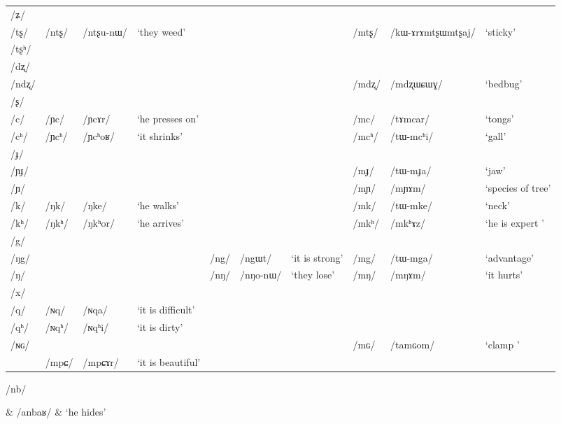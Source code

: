 \documentclass[12pt]{article}
\newcommand{\ipa}[1]{\mbox{\phon/#1/}}
\newcommand{\deux}[1]{\ipa{#1}\addtocounter{2clusters}{1}}
\newcommand{\trois}[1]{\ipa{#1}\addtocounter{3clusters}{1}}
\newcommand{\resetcounters}[2]{
\newcounter{#1}
\newcounter{#2}
 \setcounter{#1}{\value{2clusters}}
  \setcounter{#2}{\value{3clusters}}
 \setcounter{2clusters}{0}
  \setcounter{3clusters}{0}
}
\begin{document}
\begin{table}
{\begin{tabular}{llllllllll}
\ipa{ʑ} & & & & & & & & & \\
\ipa{tʂ} & \deux{ntʂ} & \ipa{ntʂu-nɯ} & `they weed' & & & & \deux{mtʂ} & \ipa{kɯ-ɤrɤmtʂɯmtʂaj} & `sticky' \\
\ipa{tʂʰ} & & & & & & & & & \\
\ipa{dʐ} & & & & & & & & & \\
\ipa{ndʐ} & & & & & & & \deux{mdʐ} & \ipa{mdʐɯɕɯɣ} & `bedbug' \\
\ipa{ʂ} & & & & & & & & & \\
\ipa{c} & \deux{ɲc} & \ipa{ɲcɤr} & `he presses on' & & & & \deux{mc} & \ipa{tɤmcar} & `tongs' \\
\ipa{cʰ} & \deux{ɲcʰ} & \ipa{ɲcʰoʁ} & `it shrinks' & & & & \deux{mcʰ} & \ipa{tɯ-mcʰi} & `gall' \\
\ipa{ɟ} & & & & & & & & & \\
\ipa{ɲɟ} & & & & & & & \deux{mɟ} & \ipa{tɯ-mɟa} & `jaw' \\
\ipa{ɲ} & & & & & & & \deux{mɲ} & \ipa{mɲɤm} & `species of tree' \\
\ipa{k} & \deux{ŋk} & \ipa{ŋke} & `he walks' & & & & \deux{mk} & \ipa{tɯ-mke} & `neck' \\
\ipa{kʰ} & \deux{ŋkʰ} & \ipa{ŋkʰor} & `he arrives' & & & & \deux{mkʰ} & \ipa{mkʰɤz} & `he is expert ' \\
\ipa{g} & & & & & & & & & \\
\ipa{ŋg} & & & & \deux{ng} & \ipa{ngɯt} & `it is strong' & \deux{mg} & \ipa{tɯ-mga} & `advantage' \\
\ipa{ŋ} & & & & \deux{nŋ} & \ipa{nŋo-nɯ} & `they lose' & \deux{mŋ} & \ipa{mŋɤm} & `it hurts' \\
\ipa{x} & & & & & & & & & \\
\ipa{q} & \deux{ɴq} & \ipa{ɴqa} & `it is difficult' & & & & & &\\
\ipa{qʰ} & \deux{ɴqʰ} & \ipa{ɴqʰi} & `it is dirty' & & & & & &\\
\ipa{ɴɢ} & & & & & & & \deux{mɢ} & \ipa{tamɢom} & `clamp ' \\
\midrule
&\trois{mpɕ} &\ipa{mpɕɤr} & `it is beautiful' \\
\bottomrule
\end{tabular}}
\end{table} 

\deux{nb} & \ipa{anbaʁ} & `he hides'

 \resetcounters{2nC}{3nC} %
 
\end{document}
